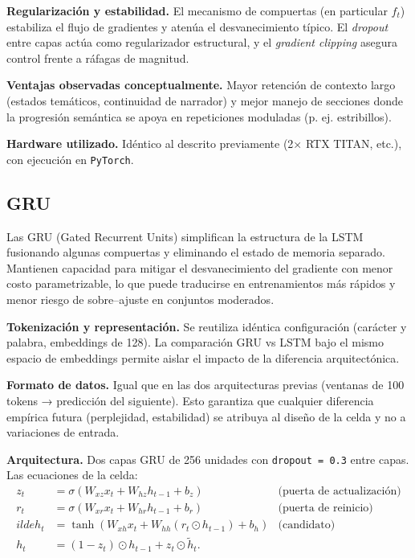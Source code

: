 \documentclass[paper=letter, fontsize=11pt, draft=false]{scrartcl}
\numberwithin{equation}{section} %
\numberwithin{figure}{section} %
\numberwithin{table}{section} %
\numberwithin{subsection}{section}
\begin{document}
\textbf{Regularización y estabilidad.} El mecanismo de compuertas (en particular $f_t$) estabiliza el flujo de gradientes y atenúa el desvanecimiento típico. El \emph{dropout} entre capas actúa como regularizador estructural, y el \emph{gradient clipping} asegura control frente a ráfagas de magnitud.

\textbf{Ventajas observadas conceptualmente.} Mayor retención de contexto largo (estados temáticos, continuidad de narrador) y mejor manejo de secciones donde la progresión semántica se apoya en repeticiones moduladas (p. ej. estribillos). 

\textbf{Hardware utilizado.} Idéntico al descrito previamente (2× RTX TITAN, etc.), con ejecución en \texttt{PyTorch}.


\newpage
\subsection{GRU}
Las GRU (Gated Recurrent Units) simplifican la estructura de la LSTM fusionando algunas compuertas y eliminando el estado de memoria separado. Mantienen capacidad para mitigar el desvanecimiento del gradiente con menor costo parametrizable, lo que puede traducirse en entrenamientos más rápidos y menor riesgo de sobre–ajuste en conjuntos moderados.

	\textbf{Tokenización y representación.} Se reutiliza idéntica configuración (carácter y palabra, embeddings de 128). La comparación GRU vs LSTM bajo el mismo espacio de embeddings permite aislar el impacto de la diferencia arquitectónica.

	\textbf{Formato de datos.} Igual que en las dos arquitecturas previas (ventanas de 100 tokens → predicción del siguiente). Esto garantiza que cualquier diferencia empírica futura (perplejidad, estabilidad) se atribuya al diseño de la celda y no a variaciones de entrada.

	\textbf{Arquitectura.} Dos capas GRU de 256 unidades con \texttt{dropout = 0.3} entre capas. Las ecuaciones de la celda:
\[
\begin{aligned}
z_t &= \sigma(W_{xz} x_t + W_{hz} h_{t-1} + b_z) & \text{(puerta de actualización)}\\
r_t &= \sigma(W_{xr} x_t + W_{hr} h_{t-1} + b_r) & \text{(puerta de reinicio)}\\
	ilde{h}_t &= \tanh(W_{xh} x_t + W_{hh} (r_t \odot h_{t-1}) + b_h) & \text{(candidato)}\\
h_t &= (1 - z_t) \odot h_{t-1} + z_t \odot \tilde{h}_t.
\end{aligned}
\]
\end{document}
